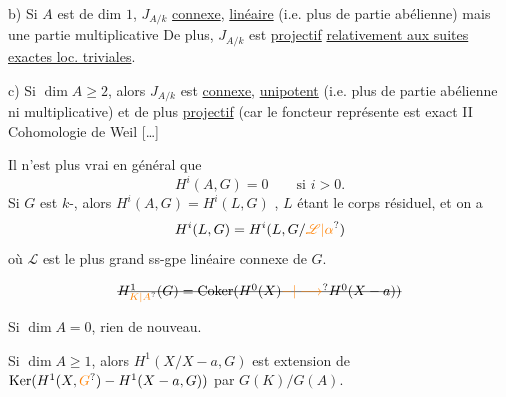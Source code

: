 \noindent b) Si $A$ est de dim $1$, $J_{A/k}$ \uline{connexe}, \uline{linéaire} (i.e. plus de partie abélienne) mais   une  partie multiplicative 
De plus, $J_{A/k}$ est \uline{projectif} \uline{relativement aux suites exactes loc. triviales}.

\noindent c) Si $\dim A\geq2$, alors $J_{A/k}$ est \uline{connexe}, \uline{unipotent} (i.e. plus de partie abélienne ni multiplicative) et de plus \uline{projectif} (car le foncteur  représente est exact\inserted{)}
II Cohomologie de Weil \unsure{\ldots} [\ldots]

Il n'est plus vrai en général que 
\[
H^i(A,G)=0\qquad\text{si }i>0.
\]
 Si $G$ est $k$-\uline{}, alors $H^i(A,G)=H^i(L,G)$ , $L$ étant le corps résiduel, et  on a
\[
H^i(L,G)=H^i(L,G/\unsure{\mathscr L|\alpha})
\]
où $\mathscr L$ est le plus grand ss-gpe linéaire connexe de $G$.

\[
\deleted{H^1_{\unsure{K|A}}(G)=\operatorname{Coker}(H^0(X)\unsure{-|\longrightarrow}H^0(X-a))}
\]

Si $\dim A=0$, rien de nouveau.

Si $\dim A\geq1$, alors $H^1(X/X-a,G)$ est extension de $\operatorname{Ker}(H^1(X,\unsure{G})-H^1(X-a,G))$ par $G(K)/G(A)$.

